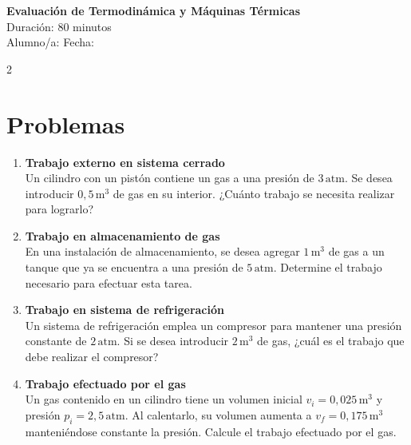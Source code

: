 \documentclass[a4paper,12pt]{article}
\begin{document}
\begin{center}
    \Large \textbf{Evaluación de Termodinámica y Máquinas Térmicas} \\
    \normalsize Duración: 80 minutos \\
    Alumno/a: \underline{\hspace{6cm}} \hspace{0.5cm} Fecha: \underline{\hspace{2cm}}
\end{center}

\vspace{0.3cm}

\begin{multicols}{2}

\section*{Problemas}

\begin{enumerate}

\item \textbf{Trabajo externo en sistema cerrado} \\
Un cilindro con un pistón contiene un gas a una presión de $3\,\text{atm}$. Se desea introducir $0{,}5\,\text{m}^3$ de gas en su interior. ¿Cuánto trabajo se necesita realizar para lograrlo?

\vspace{0.3cm}

\item \textbf{Trabajo en almacenamiento de gas} \\
En una instalación de almacenamiento, se desea agregar $1\,\text{m}^3$ de gas a un tanque que ya se encuentra a una presión de $5\,\text{atm}$. Determine el trabajo necesario para efectuar esta tarea.

\vspace{0.3cm}

\item \textbf{Trabajo en sistema de refrigeración} \\
Un sistema de refrigeración emplea un compresor para mantener una presión constante de $2\,\text{atm}$. Si se desea introducir $2\,\text{m}^3$ de gas, ¿cuál es el trabajo que debe realizar el compresor?

\vspace{0.3cm}

\item \textbf{Trabajo efectuado por el gas} \\
Un gas contenido en un cilindro tiene un volumen inicial $v_i = 0{,}025\,\text{m}^3$ y presión $p_i = 2{,}5\,\text{atm}$. Al calentarlo, su volumen aumenta a $v_f = 0{,}175\,\text{m}^3$ manteniéndose constante la presión. Calcule el trabajo efectuado por el gas.


\end{enumerate}
\end{multicols}
\end{document}
